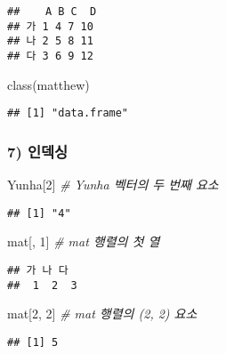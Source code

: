 \documentclass[
  12,
]{article}
\newenvironment{Shaded}{\begin{snugshade}}{\end{snugshade}}
\newcommand{\CommentTok}[1]{\textcolor[rgb]{0.56,0.35,0.01}{\textit{#1}}}
\newcommand{\DecValTok}[1]{\textcolor[rgb]{0.00,0.00,0.81}{#1}}
\newcommand{\FunctionTok}[1]{\textcolor[rgb]{0.00,0.00,0.00}{#1}}
\newcommand{\NormalTok}[1]{#1}
\newcommand{\SpecialCharTok}[1]{\textcolor[rgb]{0.00,0.00,0.00}{#1}}
\begin{document}
\begin{verbatim}
##    A B C  D
## 가 1 4 7 10
## 나 2 5 8 11
## 다 3 6 9 12
\end{verbatim}

\begin{Shaded}
\begin{Highlighting}[]
\FunctionTok{class}\NormalTok{(matthew)}
\end{Highlighting}
\end{Shaded}

\begin{verbatim}
## [1] "data.frame"
\end{verbatim}

\hypertarget{uxc778uxb371uxc2f1}{%
\subsubsection{7) 인덱싱}\label{uxc778uxb371uxc2f1}}

\begin{Shaded}
\begin{Highlighting}[]
\NormalTok{Yunha[}\DecValTok{2}\NormalTok{] }\CommentTok{\# Yunha 벡터의 두 번째 요소}
\end{Highlighting}
\end{Shaded}

\begin{verbatim}
## [1] "4"
\end{verbatim}

\begin{Shaded}
\begin{Highlighting}[]
\NormalTok{mat[, }\DecValTok{1}\NormalTok{] }\CommentTok{\# mat 행렬의 첫 열}
\end{Highlighting}
\end{Shaded}

\begin{verbatim}
## 가 나 다 
##  1  2  3
\end{verbatim}

\begin{Shaded}
\begin{Highlighting}[]
\NormalTok{mat[}\DecValTok{2}\NormalTok{, }\DecValTok{2}\NormalTok{] }\CommentTok{\# mat 행렬의 (2, 2) 요소}
\end{Highlighting}
\end{Shaded}

\begin{verbatim}
## [1] 5
\end{verbatim}

\begin{Shaded}
\end{Shaded}
\end{document}
